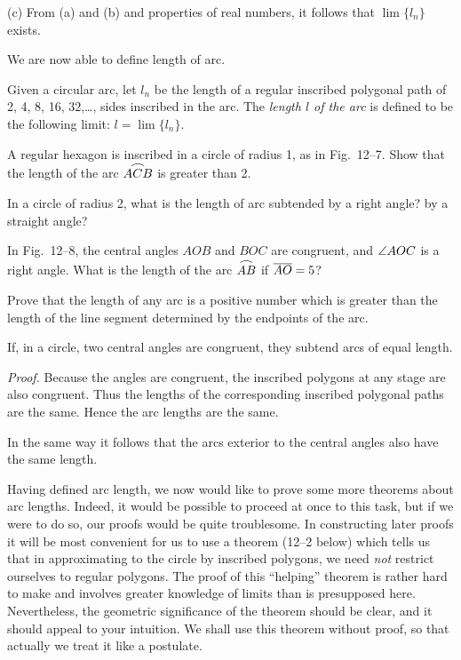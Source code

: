\documentclass[11pt]{book}
\newcommand{\XIIarc}[1]{\overset{\raisebox{-0.25ex}{\scalebox{1.15}[0.85]{$\frown$}}}{#1}}
\begin{document}
(c) From (a) and (b) and properties of real numbers, it follows that
$\lim \{l_n\}$ exists.

We are now able to define length of arc.

\begin{definition}
Given a circular arc, let $l_n$ be the length of a regular inscribed polygonal
path of 2, 4, 8, 16, 32,\ldots, sides inscribed in the arc. The \emph{length $l$
of the arc} is defined to be the following limit: $l = \lim \{l_n\}$.
\end{definition}

\begin{exercisecols}
\begin{exlist}
\item A regular hexagon is inscribed in a circle of radius 1, as in
      Fig.~12--7. Show that the length of the arc $\XIIarc{ACB}$ is greater
      than 2.
\exfig{\FIGXIISEVEN}
\item In a circle of radius 2, what is the length of arc subtended by a right
      angle? by a straight angle?
\item In Fig.~12--8, the central angles $AOB$ and $BOC$ are congruent, and
      $\angle AOC$ is a right angle. What is the length of the arc $\XIIarc{AB}$
      if $\overline{AO} = 5$?
\exfig{\FIGXIIEIGHT}
\item[\stex 4.] Prove that the length of any arc is a positive number which is
      greater than the length of the line segment determined by the endpoints of
      the arc.
\end{exlist}
\end{exercisecols}

\begin{theorem}
If, in a circle, two central angles are congruent, they subtend arcs of equal
length.
\end{theorem}

\noindent\emph{Proof.} Because the angles are congruent, the inscribed polygons
at any stage are also congruent. Thus the lengths of the corresponding
inscribed polygonal paths are the same. Hence the arc lengths are the same.

\begin{remark}
In the same way it follows that the arcs exterior to the central angles also
have the same length.
\end{remark}

Having defined arc length, we now would like to prove some more theorems about
arc lengths. Indeed, it would be possible to proceed at once to this task, but
if we were to do so, our proofs would be quite troublesome. In constructing
later proofs it will be most convenient for us to use a theorem (12--2 below)
which tells us that in approximating to the circle by inscribed polygons, we
need \emph{not} restrict ourselves to regular polygons. The proof of this
``helping'' theorem is rather hard to make and involves greater knowledge of
limits than is presupposed here. Nevertheless, the geometric significance of the
theorem should be clear, and it should appeal to your intuition. We shall use
this theorem without proof, so that actually we treat it like a postulate.
\end{document}
